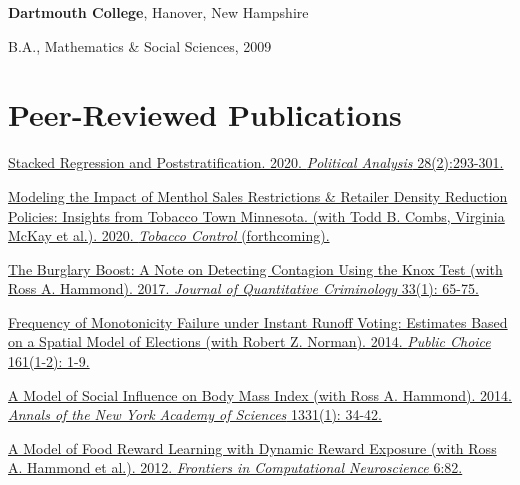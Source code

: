\documentclass[margin,line]{res}
\newenvironment{list1}{
  \begin{list}{}{%
      \setlength{\itemsep}{0.1in}
      \setlength{\parsep}{0in} \setlength{\parskip}{0in}
      \setlength{\topsep}{0.1in} \setlength{\partopsep}{0in} 
      \setlength{\leftmargin}{0.17in}}}{\end{list}}
\newenvironment{publist}{
	\begin{list}{}{%
			\setlength{\itemsep}{0.15in}
			\setlength{\parsep}{0in} \setlength{\parskip}{0in}
			\setlength{\topsep}{0in} \setlength{\partopsep}{0in} 
			\setlength{\leftmargin}{0.15in}
			\setlength{\itemindent}{-0.15in}}}
		{\end{list}}
\begin{document}
\begin{resume}
{\bf Dartmouth College}, Hanover, New Hampshire
\begin{list1}
\item[] B.A., Mathematics \& Social Sciences, 2009
\end{list1}




\section{\sc Peer-Reviewed Publications}

\begin{publist}
	
	\item \href{https://doi.org/10.1017/pan.2019.43}{Stacked Regression and Poststratification. 2020. \textit{Political Analysis} 28(2):293-301.}
	
	\item \href{http://dx.doi.org/10.1136/tobaccocontrol-2019-054986}{Modeling the Impact of Menthol Sales Restrictions \& Retailer Density Reduction Policies: Insights from Tobacco Town Minnesota. (with Todd B. Combs, Virginia McKay et al.). 2020. \textit{Tobacco Control} (forthcoming).}
	
	\item \href{https://joeornstein.github.io/papers/Ornstein-Hammond2017.pdf}{The Burglary Boost: A Note on Detecting Contagion Using the Knox Test (with Ross A. Hammond). 2017. \textit{Journal of Quantitative Criminology} 33(1): 65-75.}
	
	\item \href{https://joeornstein.github.io/MonotonicityFailure.html}{Frequency of Monotonicity Failure under Instant Runoff Voting: Estimates Based on a Spatial Model of Elections (with Robert Z. Norman). 2014. \textit{Public Choice} 161(1-2): 1-9.}
	
	\item \href{https://joeornstein.github.io/papers/Hammond_et_al-2014-Annals_of_the_New_York_Academy_of_Sciences.pdf}{A Model of Social Influence on Body Mass Index (with Ross A. Hammond). 2014. \textit{Annals of the New York Academy of Sciences} 1331(1): 34-42.}
	
	\item \href{https://joeornstein.github.io/papers/Hammond-2012.pdf}{A Model of Food Reward Learning with Dynamic Reward Exposure (with Ross A. Hammond et al.). 2012. \textit{Frontiers in Computational Neuroscience} 6:82.}	
\end{publist}






\end{resume}
\end{document}
